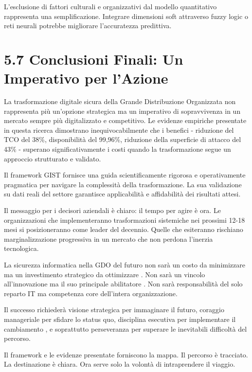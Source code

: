 L'esclusione di fattori culturali e organizzativi dal modello quantitativo rappresenta una semplificazione. Integrare dimensioni soft attraverso fuzzy logic o reti neurali potrebbe migliorare l'accuratezza predittiva.

\section{5.7 Conclusioni Finali: Un Imperativo per l'Azione}

La trasformazione digitale sicura della Grande Distribuzione Organizzata non rappresenta più un'opzione strategica ma un imperativo di sopravvivenza in un mercato sempre più digitalizzato e competitivo. Le evidenze empiriche presentate in questa ricerca dimostrano inequivocabilmente che i benefici - riduzione del TCO del 38\%, disponibilità del 99,96\%, riduzione della superficie di attacco del 43\% - superano significativamente i costi quando la trasformazione segue un approccio strutturato e validato.

Il framework GIST fornisce una guida scientificamente rigorosa e operativamente pragmatica per navigare la complessità della trasformazione. La sua validazione su dati reali del settore garantisce applicabilità e affidabilità dei risultati attesi.

Il messaggio per i decisori aziendali è chiaro: il tempo per agire è ora. Le organizzazioni che implementeranno trasformazioni sistemiche nei prossimi 12-18 mesi si posizioneranno come leader del decennio. Quelle che esiteranno rischiano marginalizzazione progressiva in un mercato che non perdona l'inerzia tecnologica.

La sicurezza informatica nella GDO del futuro non sarà un costo da minimizzare ma un investimento strategico da ottimizzare \autocite{forrester2024cloud}. Non sarà un vincolo all'innovazione ma il suo principale abilitatore \autocite{gartner2024market}. Non sarà responsabilità del solo reparto IT ma competenza core dell'intera organizzazione.

Il successo richiederà visione strategica per immaginare il futuro, coraggio manageriale per sfidare lo status quo, disciplina esecutiva per implementare il cambiamento \autocite{mckinsey2023}, e soprattutto perseveranza per superare le inevitabili difficoltà del percorso.

Il framework e le evidenze presentate forniscono la mappa. Il percorso è tracciato. La destinazione è chiara. Ora serve solo la volontà di intraprendere il viaggio.


